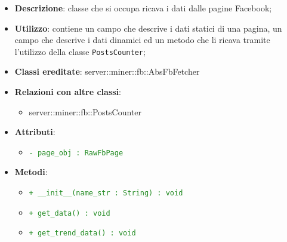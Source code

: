 			\begin{itemize}
				\item \textbf{Descrizione}: classe che si occupa ricava i dati dalle pagine Facebook;
				\item \textbf{Utilizzo}: contiene un campo che descrive i dati statici di una pagina, un campo che descrive i dati dinamici ed un metodo che li ricava tramite l'utilizzo della classe \texttt{PostsCounter};
				\item \textbf{Classi ereditate}: server::miner::fb::AbsFbFetcher
				\item \textbf{Relazioni con altre classi}:
					\begin{itemize}
						\item server::miner::fb::PostsCounter
					\end{itemize}
				\item \textbf{Attributi}: 
					\begin{itemize}
						\item \textcolor{forestgreen}{\texttt{- page\_obj : RawFbPage}}
					\end{itemize}
				\item \textbf{Metodi}:   
					\begin{itemize}
						\item \textcolor{forestgreen}{\texttt{+ \_\_init\_\_(name\_str : String) : void}}
						\item \textcolor{forestgreen}{\texttt{+ get\_data() : void}}
						\item \textcolor{forestgreen}{\texttt{+ get\_trend\_data() : void}}

\end{itemize}
\end{itemize}
